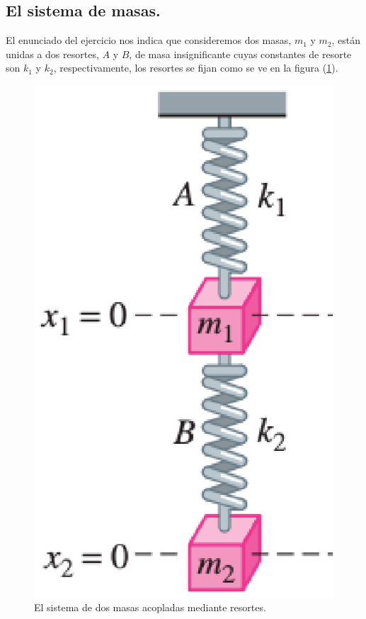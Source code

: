 \subsection{El sistema de masas.}

El enunciado del ejercicio nos indica que consideremos dos masas, $m_{1}$ y $m_{2}$, están unidas a dos resortes, $A$ y $B$, de masa insignificante cuyas constantes de resorte son $k_{1}$ y $k_{2}$, respectivamente, los resortes se fijan como se ve en la figura (\ref{fig:figura_dos_masas_01}).

\begin{figure}[H]
    \centering
    \includegraphics[scale=0.6]{Imagenes/Ejercicio_Dos_Masas_01.eps}
    \caption{El sistema de dos masas acopladas mediante resortes.}
    \label{fig:figura_dos_masas_01}
\end{figure}

